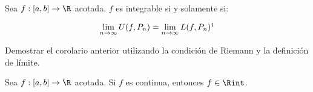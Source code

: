 \begin{cor}
    Sea $f: [a,b] \rightarrow \R$ acotada. $f$ es integrable si y solamente si:
    
    \[
    \lim_{n \to \infty} U(f, P_n) = \lim_{n \to \infty} L(f, P_n)\footnotemark
    \]
\end{cor}

\begin{ejer}
    Demostrar el corolario anterior utilizando la condición de Riemann y la definición de límite.
\end{ejer}

\begin{teo}\label{teo:contint}
    Sea $f: [a,b] \rightarrow \R$ acotada. Si $f$ es continua, entonces $f \in \Rint$.
\end{teo}

